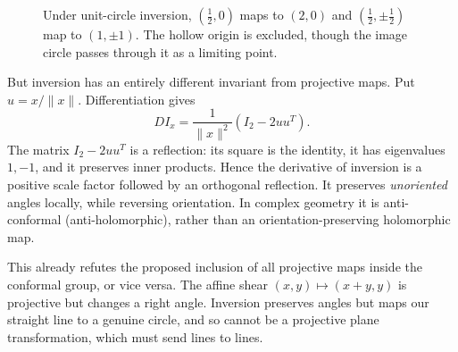 \begin{figure}[H]
\centering
{}
\caption{Under unit-circle inversion, $(\tfrac12,0)$ maps to $(2,0)$ and $(\tfrac12,\pm\tfrac12)$ map to $(1,\pm1)$. The hollow origin is excluded, though the image circle passes through it as a limiting point.}
\end{figure}

But inversion has an entirely different invariant from projective maps. Put $u=x/\|x\|$. Differentiation gives
\[
 DI_x=\frac1{\|x\|^2}(I_2-2uu^T).
\]
The matrix $I_2-2uu^T$ is a reflection: its square is the identity, it has eigenvalues $1,-1$, and it preserves inner products. Hence the derivative of inversion is a positive scale factor followed by an orthogonal reflection. It preserves \emph{unoriented} angles locally, while reversing orientation. In complex geometry it is anti-conformal (anti-holomorphic), rather than an orientation-preserving holomorphic map.

This already refutes the proposed inclusion of all projective maps inside the conformal group, or vice versa. The affine shear $(x,y)\mapsto(x+y,y)$ is projective but changes a right angle. Inversion preserves angles but maps our straight line to a genuine circle, and so cannot be a projective plane transformation, which must send lines to lines.

